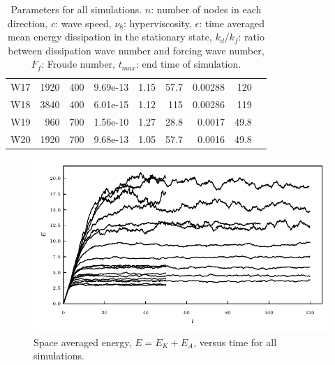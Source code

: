 \documentclass{jfm}
\begin{document}
\begin{table}
\begin{center}
\begin{tabular}{lrrrrrrrr}
W17 &  1920 &  400 & 9.69e-13 &        1.15 &                    57.7 & 0.00288 &                 120 \\
W18 &  3840 &  400 & 6.01e-15 &        1.12 &                     115 & 0.00286 &                119 \\
W19 &   960 &  700 & 1.56e-10 &        1.27 &                    28.8 &  0.0017 &                49.8 \\
W20 &  1920 &  700 & 9.68e-13 &        1.05 &                    57.7 &  0.0016 &                49.8 \\
\bottomrule

\end{tabular}
\caption{Parameters for all simulations. $ n $: number of nodes in each
direction, $ c $: wave speed, $ \nu_8 $: hyperviscosity, $ \epsilon $: time
averaged mean energy dissipation in the stationary state, $ k_{d}/ k_f $: ratio
between dissipation wave number and forcing wave number, $ F_f $: Froude
number, $ t_{max} $: end time of simulation.}
\end{center}
\end{table}





\begin{figure}
\centerline{\includegraphics[width=5.12in]{../Pyfig/fig_Emean_time}}
\caption{Space averaged energy, $E = E_K + E_A $, versus time for all
simulations. }
\label{fig_Evstime}
\end{figure}
\end{document}
